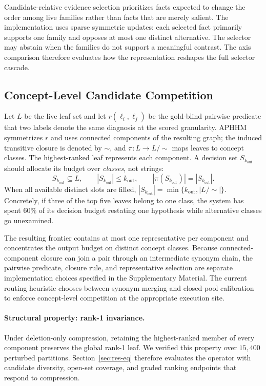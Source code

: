 \documentclass[letterpaper]{article} %
\begin{document}
Candidate-relative evidence selection prioritizes facts expected to change the order among live families rather than facts that are merely salient.
The implementation uses sparse symmetric updates: each selected fact primarily supports one family and opposes at most one distinct alternative.
The selector may abstain when the families do not support a meaningful contrast.
The axis comparison therefore evaluates how the representation reshapes the full selector cascade.

\subsection{Concept-Level Candidate Competition}
\label{sec:m3}

Let $L$ be the live leaf set and let $r(\ell_i,\ell_j)$ be the gold-blind pairwise predicate that two labels denote the same diagnosis at the scored granularity.
APHHM symmetrizes $r$ and uses connected components of the resulting graph; the induced transitive closure is denoted by $\sim$, and $\pi:L\rightarrow L/\!\sim$ maps leaves to concept classes.
The highest-ranked leaf represents each component.
A decision set $S_{k_{\mathrm{out}}}$ should allocate its budget over \emph{classes}, not strings:
\[
S_{k_{\mathrm{out}}}\subseteq L,\qquad
|S_{k_{\mathrm{out}}}|\leq k_{\mathrm{out}},\qquad
|\pi(S_{k_{\mathrm{out}}})|=|S_{k_{\mathrm{out}}}|.
\]
When all available distinct slots are filled,
$|S_{k_{\mathrm{out}}}|=\min\{k_{\mathrm{out}},|L/\!\sim|\}$.
Concretely, if three of the top five leaves belong to one class, the system has spent $60\%$ of its decision budget restating one hypothesis while alternative classes go unexamined.

The resulting frontier contains at most one representative per component and concentrates the output budget on distinct concept classes.
Because connected-component closure can join a pair through an intermediate synonym chain, the pairwise predicate, closure rule, and representative selection are separate implementation choices specified in the Supplementary Material.
The current routing heuristic chooses between synonym merging and closed-pool calibration to enforce concept-level competition at the appropriate execution site.

\paragraph{Structural property: rank-1 invariance.}
Under deletion-only compression, retaining the highest-ranked member of every component preserves the global rank-1 leaf.
We verified this property over $15{,}400$ perturbed partitions.
Section~\ref{sec:res-eq} therefore evaluates the operator with candidate diversity, open-set coverage, and graded ranking endpoints that respond to compression.
\end{document}

